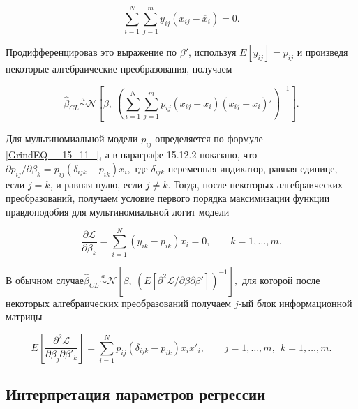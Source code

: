 \begin{equation} \label{GrindEQ__15_14_} \sum^N_{i=1}{\sum^m_{j=1}{y_{ij}\left(x_{ij}-{\overline{x}}_i\right)=0.}} \end{equation} 

Продифференцировав это выражение по $\beta '$, используя $E\left[y_{ij}\right]=p_{ij}$ и произведя некоторые алгебраические преобразования, получаем

\begin{equation} \label{GrindEQ__15_15_} {\widehat{\beta }}_{CL}\overset{a}{\sim }
{\mathcal N}\left[\beta ,\ {\left(\sum^N_{i=1}{\sum^m_{j=1}{p_{ij}}}\left(x_{ij}-{\overline{x}}_i\right)\left(x_{ij}-{\overline{x}}_i\right)'\right)}^{-1}\right]. \end{equation} 

Для мультиномиальной модели $p_{ij}$ определяется по формуле \eqref{GrindEQ__15_11_}, а в параграфе 15.12.2 показано, что ${\partial p_{ij}}/{\partial {\beta }_k}=p_{ij}\left({\delta }_{ijk}-p_{ik}\right)x_i,$ где ${\delta }_{ijk}$ переменная-индикатор, равная единице, если $j=k$, и равная нулю, если $j\ne k.$ Тогда, после некоторых алгебраических преобразований, получаем условие первого порядка максимизации функции правдоподобия для мультиномиальной логит модели

\begin{equation} \label{GrindEQ__15_16_} \frac{\partial {\mathcal L}}{\partial {\beta }_k}=\sum^N_{i=1}{\left(y_{ik}-p_{ik}\right)x_i=0,\ \ \ \ \ \ \ \ \ k=1,\dots ,m.} \end{equation} 

В обычном случае${\widehat{\beta }}_{CL}\overset{a}{\sim }
{\mathcal N}\left[\beta ,\ {\left(E\left[{{\partial }^2{\mathcal L}}/{\partial\beta \partial{\beta }'}\right]\right)}^{-1}\right],$ для которой после некоторых алгебраических преобразований получаем $j$-ый блок информационной матрицы

\begin{equation} \label{GrindEQ__15_17_} E\left[\frac{{\partial }^2{\mathcal L}}{\partial {\beta }_j\partial {\beta }'_k}\right]=\sum^N_{i=1}{p_{ij}\left({\delta }_{ijk}-p_{ik}\right)x_ix'_i},\ \ \ \ \ \ \ \ \ j=1,\dots ,m,\ \ k=1,\dots ,m. \end{equation} 

\subsection{Интерпретация параметров регрессии}

